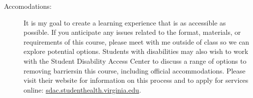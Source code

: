 \documentclass[11pt]{article}
\begin{document}
\begin{description}
\item[Accomodations:]  

It is my goal to create a learning experience that is as accessible as possible. If you anticipate any issues related to the format, materials, or requirements of this course, please meet with me outside of class so we can explore potential options. Students with disabilities may also wish to work with the Student Disability Access Center to discuss a range of options to removing barriersin this course, including official accommodations. Please visit their website for information on this process and to apply for services online: \url{sdac.studenthealth.virginia.edu}. 

\end{description}
\end{document}
